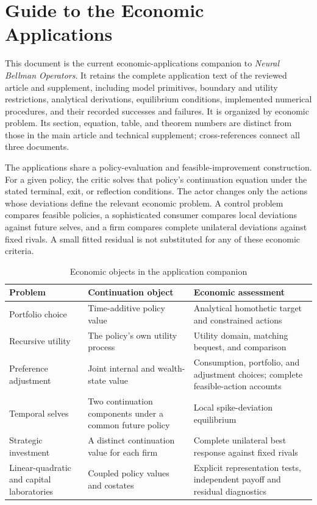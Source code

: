 \section*{Guide to the Economic Applications}
This document is the current economic-applications companion to \emph{Neural Bellman Operators}. It retains the complete application text of the reviewed article and supplement, including model primitives, boundary and utility restrictions, analytical derivations, equilibrium conditions, implemented numerical procedures, and their recorded successes and failures. It is organized by economic problem. Its section, equation, table, and theorem numbers are distinct from those in the main article and technical supplement; cross-references connect all three documents.

The applications share a policy-evaluation and feasible-improvement construction. For a given policy, the critic solves that policy's continuation equation under the stated terminal, exit, or reflection conditions. The actor changes only the actions whose deviations define the relevant economic problem. A control problem compares feasible policies, a sophisticated consumer compares local deviations against future selves, and a firm compares complete unilateral deviations against fixed rivals. A small fitted residual is not substituted for any of these economic criteria.

\begin{table}[ht]
\centering
\caption{Economic objects in the application companion}
\label{tab:r16applicationsguide}
\begin{tabular}{p{}p{}p{}}
\toprule
Problem & Continuation object & Economic assessment\\
\midrule
Portfolio choice & Time-additive policy value & Analytical homothetic target and constrained actions\\
Recursive utility & The policy's own utility process & Utility domain, matching bequest, and comparison\\
Preference adjustment & Joint internal and wealth-state value & Consumption, portfolio, and adjustment choices; complete feasible-action accounts\\
Temporal selves & Two continuation components under a common future policy & Local spike-deviation equilibrium\\
Strategic investment & A distinct continuation value for each firm & Complete unilateral best response against fixed rivals\\
Linear-quadratic and capital laboratories & Coupled policy values and costates & Explicit representation tests, independent payoff and residual diagnostics\\
\bottomrule
\end{tabular}
\end{table}

